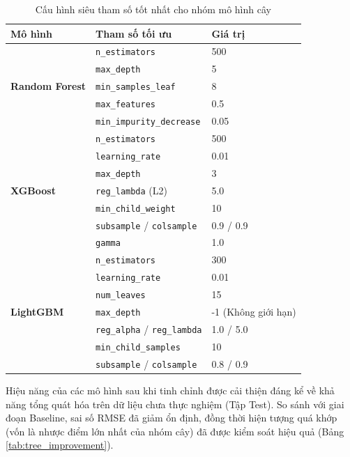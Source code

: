 \begin{table}[H]
    \centering
    \caption{Cấu hình siêu tham số tốt nhất cho nhóm mô hình cây}
    \label{tab:tree_best_params}
    \begin{tabular}{|l|l|l|}
    \hline
    \textbf{Mô hình} & \textbf{Tham số tối ưu} & \textbf{Giá trị} \\ \hline
    \multirow{5}{*}{\textbf{Random Forest}} & \texttt{n\_estimators} & 500 \\
     & \texttt{max\_depth} & 5 \\
     & \texttt{min\_samples\_leaf} & 8 \\
     & \texttt{max\_features} & 0.5 \\
     & \texttt{min\_impurity\_decrease} & 0.05 \\ \hline
    \multirow{7}{*}{\textbf{XGBoost}} & \texttt{n\_estimators} & 500 \\
     & \texttt{learning\_rate} & 0.01 \\
     & \texttt{max\_depth} & 3 \\
     & \texttt{reg\_lambda} (L2) & 5.0 \\
     & \texttt{min\_child\_weight} & 10 \\
     & \texttt{subsample} / \texttt{colsample} & 0.9 / 0.9 \\
     & \texttt{gamma} & 1.0 \\ \hline
    \multirow{7}{*}{\textbf{LightGBM}} & \texttt{n\_estimators} & 300 \\
     & \texttt{learning\_rate} & 0.01 \\
     & \texttt{num\_leaves} & 15 \\
     & \texttt{max\_depth} & -1 (Không giới hạn) \\
     & \texttt{reg\_alpha} / \texttt{reg\_lambda} & 1.0 / 5.0 \\
     & \texttt{min\_child\_samples} & 10 \\
     & \texttt{subsample} / \texttt{colsample} & 0.8 / 0.9 \\ \hline
    \end{tabular}
\end{table}

Hiệu năng của các mô hình sau khi tinh chỉnh được cải thiện đáng kể về khả năng tổng quát hóa trên dữ liệu chưa thực nghiệm (Tập Test). So sánh với giai đoạn Baseline, sai số RMSE đã giảm ổn định, đồng thời hiện tượng quá khớp (vốn là nhược điểm lớn nhất của nhóm cây) đã được kiểm soát hiệu quả (Bảng \ref{tab:tree_improvement}).

